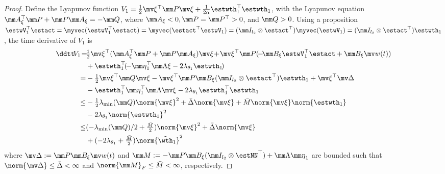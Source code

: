 \documentclass[letterpaper, 10 pt, conference]{ieeeconf}  %
\begin{document}
\begin{proof}
Define the Lyapunov function $V_1=\tfrac{1}{2}\mv\xi^\top \mm P\mv\xi+\tfrac{1}{2\alpha}{\estwth}_1^\top {\estwth}_1$, with the Lyapunov equation $\mm A_\xi^\top \mm P+\mm P\mm A_\xi=-\mm Q$, where $\mm A_\xi<0,\mm P=\mm P^\top >0$, and $\mm Q>0$.
Using a proposition $\estwV_1^\top \estact = \myvec(\estwV_1^\top \estact)=\myvec(\estact^\top \estwV_1) = (\mm I_{l_2}\otimes {\estact}^\top )\myvec(\estwV_1)=(\mm I_{l_2}\otimes \estact^\top ){\estwth}_1$ \cite[Proposition~(7.1.9)]{Bernstein:2009aa}, the time derivative of $V_1$ is
\begin{equation}
    \begin{aligned}
        \ddtt \! {V}_1 
        \!=\!& 
        \tfrac{1}{2}
        \mv \xi^\top 
            (
                \mm A_\xi^\top \mm P+\mm P\mm A_\xi
            )
        \mv \xi
        \!+\!
        \mv \xi^\top \mm P (
            \!-\!\mm B_\xi\estwV_1^\top \estact +\mm B_\xi \mv w(t) 
        )\\
        &
        +{\estwth}_1^\top 
        \!
        (\!
            -{\mm \eta}_1^\top \mm \Lambda \xi-2\lambda_{\theta_1} {\estwth}_1 
        \!)
        \\
        =& 
        -\tfrac{1}{2}
        \mv \xi^\top \mm Q\mv \xi 
        -
        \mv \xi^\top \mm P\mm B_\xi(\mm I_{l_2}\otimes \estact^\top ){\estwth}_1 
        +\mv \xi^\top \mv \Delta
        \\
        &
        -{\estwth}_1^\top {\mm \eta}_1^\top \mm \Lambda\mv \xi
        -2\lambda_{\theta_1} {\estwth}_1^\top {\estwth}_1
        \\
        \le&
        -
        \tfrac{1}{2}
        \lambda_\text{min}(\mm Q)\norm{\mv \xi} ^2
        +\bar\Delta \norm{\mv \xi}
        +\bar M\norm{\mv \xi} \norm{{\estwth}_1}
        \\
        &
        -2\lambda_{\theta_1}
        \norm{{\estwth}_1}^2
        \\
        \le& 
        (
        -{\lambda_\text{min}(\mm Q)/ 2} +{\tfrac{\bar M}{2}}
        )
        \norm{\mv \xi}^2 +\bar\Delta \norm{\mv \xi}
        \\
        &+ 
        (
        -2\lambda_{\theta_1} 
        +\tfrac{\bar M}{2}
        )
        \norm{\tilde{\wth}_1}^2 
        \end{aligned}
        \label{eq. lya 1}
\end{equation}
where $\mv \Delta:= \mm P\mm B_\xi \mv w(t)$ and $\mm M:= -\mm P\mm B_\xi(\mm I_{l_2}\otimes \estNN^\top )+\mm \Lambda{\mm \eta}_1$ are bounded such that $\norm{\mv \Delta}\le\bar\Delta<\infty$ and $\norm{\mm M}_F\le \bar M< \infty$, respectively.


\end{proof}
\end{document}
